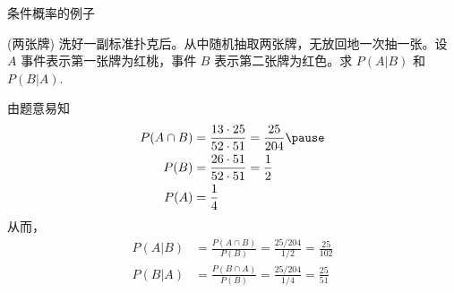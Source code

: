 \documentclass[Prob-All.tex]{subfiles}
\begin{document}
\begin{frame}{条件概率的例子}
	\begin{exam}
		(两张牌) 洗好一副标准扑克后。从中随机抽取两张牌，无放回地一次抽一张。设 $A$ 事件表示第一张牌为红桃，事件 $B$ 表示第二张牌为红色。求 $P ( A | B )$ 和 $P ( B | A )$.
	\end{exam}

	\begin{jieda}
	  由题意易知
	  \begin{align*}
		P(A\cap B) &=\frac{13 \cdot 25}{52 \cdot 51}=\frac{25}{204}\pause \\
		P(B)&=\frac{26 \cdot 51}{52 \cdot 51}=\frac{1}{2} \\
		P(A) &=\frac{1}{4}
	  \end{align*}
	  \pause
	  从而，
	  \begin{align*}
		P(A|B) &=\frac{P(A\cap B)}{P(B)}=\frac{25/204}{1/2}=\frac{25}{102}\\
		P(B|A) &=\frac{P(B \cap A)}{P(B)}=\frac{25/204}{1/4}=\frac{25}{51}
	  \end{align*}



	\end{jieda}

	\end{frame}
\end{document}
